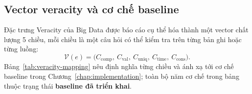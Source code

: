 \subsection{Vector veracity và cơ chế baseline}
\label{subsec:veracity}

Đặc trưng Veracity của Big Data được báo cáo cụ thể hóa thành một vector chất
lượng 5 chiều, mỗi chiều là một câu hỏi có thể kiểm tra trên từng bản ghi
hoặc từng luồng:
\begin{equation}
  \mathcal{V}(e) = \bigl(C_{\mathrm{comp}},\ C_{\mathrm{val}},\
  C_{\mathrm{uniq}},\ C_{\mathrm{time}},\ C_{\mathrm{cons}}\bigr).
  \label{eq:veracity-vector}
\end{equation}
Bảng~\ref{tab:veracity-mapping} nêu định nghĩa từng chiều và ánh xạ tới cơ
chế baseline trong Chương~\ref{chap:implementation}; toàn bộ năm cơ chế
trong bảng thuộc trạng thái \textbf{baseline đã triển khai}.

